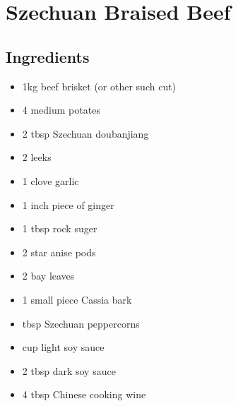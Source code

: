 \section{Szechuan Braised Beef}


\begin{multicols}{2}
  \subsection{Ingredients}
    \begin{itemize}
      \item 1kg beef brisket (or other such cut)
      \item 4 medium potates
      \item 2 tbsp Szechuan doubanjiang
      \item 2 leeks
      \item 1 clove garlic
      \item 1 inch piece of ginger
      \item 1 tbsp rock suger
      \item 2 star anise pods
      \item 2 bay leaves
      \item 1 small piece Cassia bark
      \item {} tbsp Szechuan peppercorns
      \item {} cup light soy sauce
      \item 2 tbsp dark soy sauce
      \item 4 tbsp Chinese cooking wine
    \end{itemize}
  \vfill\null
  \columnbreak

\end{multicols}
